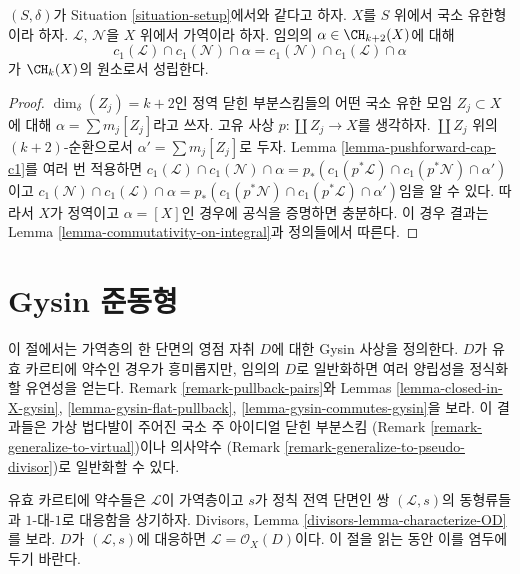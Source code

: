 \begin{lemma}
\label{lemma-cap-commutative}
$(S, \delta)$가 Situation \ref{situation-setup}에서와 같다고 하자.
$X$를 $S$ 위에서 국소 유한형이라 하자. $\mathcal{L}$, $\mathcal{N}$을
$X$ 위에서 가역이라 하자. 임의의 $\alpha \in \CH_{k + 2}(X)$에 대해
$$
c_1(\mathcal{L}) \cap c_1(\mathcal{N}) \cap \alpha
=
c_1(\mathcal{N}) \cap c_1(\mathcal{L}) \cap \alpha
$$
가 $\CH_k(X)$의 원소로서 성립한다.
\end{lemma}

\begin{proof}
$\dim_\delta(Z_j) = k + 2$인 정역 닫힌 부분스킴들의 어떤 국소 유한 모임
$Z_j \subset X$에 대해 $\alpha = \sum m_j[Z_j]$라고 쓰자. 고유 사상
$p : \coprod Z_j \to X$를 생각하자. $\coprod Z_j$ 위의
$(k + 2)$-순환으로서 $\alpha' = \sum m_j[Z_j]$로 두자. Lemma
\ref{lemma-pushforward-cap-c1}를 여러 번 적용하면
$c_1(\mathcal{L}) \cap c_1(\mathcal{N}) \cap \alpha
= p_*(c_1(p^*\mathcal{L}) \cap c_1(p^*\mathcal{N}) \cap \alpha')$이고
$c_1(\mathcal{N}) \cap c_1(\mathcal{L}) \cap \alpha
= p_*(c_1(p^*\mathcal{N}) \cap c_1(p^*\mathcal{L}) \cap \alpha')$임을
알 수 있다. 따라서 $X$가 정역이고 $\alpha = [X]$인 경우에 공식을
증명하면 충분하다. 이 경우 결과는 Lemma
\ref{lemma-commutativity-on-integral}과 정의들에서 따른다.
\end{proof}






\section{Gysin 준동형}
\label{section-intersecting-effective-Cartier}

\noindent
이 절에서는 가역층의 한 단면의 영점 자취 $D$에 대한 Gysin 사상을
정의한다. $D$가 유효 카르티에 약수인 경우가 흥미롭지만, 임의의 $D$로
일반화하면 여러 양립성을 정식화할 유연성을 얻는다. Remark
\ref{remark-pullback-pairs}와 Lemmas \ref{lemma-closed-in-X-gysin},
\ref{lemma-gysin-flat-pullback}, \ref{lemma-gysin-commutes-gysin}을 보라.
이 결과들은 가상 법다발이 주어진 국소 주 아이디얼 닫힌 부분스킴
(Remark \ref{remark-generalize-to-virtual})이나 의사약수
(Remark \ref{remark-generalize-to-pseudo-divisor})로 일반화할 수 있다.

\medskip\noindent
유효 카르티에 약수들은 $\mathcal{L}$이 가역층이고 $s$가 정칙 전역
단면인 쌍 $(\mathcal{L}, s)$의 동형류들과 $1$-대-$1$로 대응함을 상기하자.
Divisors, Lemma \ref{divisors-lemma-characterize-OD}를 보라. $D$가
$(\mathcal{L}, s)$에 대응하면 $\mathcal{L} = \mathcal{O}_X(D)$이다.
이 절을 읽는 동안 이를 염두에 두기 바란다.

